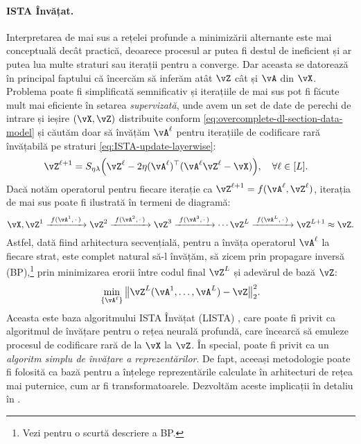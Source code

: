 \documentclass[../../book-main_ro.tex]{subfiles}
\begin{document}
\paragraph{ISTA Învățat.} Interpretarea de mai sus a rețelei profunde a
minimizării alternante este mai conceptuală decât practică, deoarece procesul ar putea
fi destul de ineficient și ar putea lua multe straturi sau iterații pentru a converge.
Dar aceasta
se datorează în principal faptului că încercăm să inferăm atât \(\vZ\) cât și \(\vA\) din \(\vX\).
Problema poate fi simplificată semnificativ și iterațiile de mai sus pot fi făcute
mult mai eficiente în setarea \textit{supervizată}, unde avem un set de date de perechi
de intrare și ieșire \((\vX, \vZ)\) distribuite conform
\eqref{eq:overcomplete-dl-section-data-model} și căutăm doar să învățăm
\(\vA^\ell\) pentru iterațiile de codificare rară învățabilă pe straturi
\eqref{eq:ISTA-update-layerwise}:
\begin{align}
    & \vZ^{\ell + 1} = S_{\eta\lambda}\rp{\vZ^{\ell} - 2\eta(\vA^{\ell})^{\top}(\vA^\ell\vZ^{\ell} - \vX)}, \quad \forall \ell \in [L].
\end{align}
Dacă notăm operatorul pentru fiecare iterație ca $\vZ^{\ell + 1} = f(\vA^\ell, \vZ^\ell)$, iterația de mai sus poate fi ilustrată în termeni de diagramă:
\begin{equation*}
\vX, \vZ^1 \xrightarrow{\hspace{1mm} f(\vA^1,\,\cdot\,) \hspace{1mm}}  \vZ^2 \xrightarrow{\hspace{1mm} f(\vA^2,\,\cdot\,) \hspace{1mm}}  \vZ^3  \xrightarrow{\hspace{1mm} f(\vA^3,\,\cdot\,) \hspace{1mm}} \cdots \vZ^{L}  \xrightarrow{\hspace{1mm} f(\vA^{L},\,\cdot\,) \hspace{1mm}} \vZ^{L + 1} \approx \vZ.  
\label{eqn:deep-sparse-encoding}
\end{equation*}
Astfel, dată fiind arhitectura secvențială, pentru a învăța operatorul \(\vA^\ell\) la
fiecare strat, este complet natural să-l învățăm, să zicem prin propagare inversă
(BP),\footnote{Vezi  pentru o scurtă descriere a BP.} prin minimizarea erorii între codul final $\vZ^L$ și adevărul de bază $\vZ$:
\begin{equation}\label{eq:lista-training}
    \min_{\{\vA^\ell\}} \big\|\vZ^L(\vA^1, \ldots, \vA^{L}) - \vZ\big\|_2^2.
\end{equation}
Aceasta este baza algoritmului ISTA Învățat (LISTA) \cite{gregor2010learning}, care poate fi privit ca algoritmul de învățare pentru o rețea neurală profundă, care încearcă să emuleze procesul de codificare rară de la $\vX$ la $\vZ$. În special, poate fi privit ca un \textit{algoritm simplu de învățare a reprezentărilor}.
De fapt, aceeași metodologie poate fi folosită ca bază pentru a înțelege
reprezentările calculate în arhitecturi de rețea mai puternice, cum ar fi
transformatoarele. Dezvoltăm aceste implicații în detaliu în .
\end{document}
